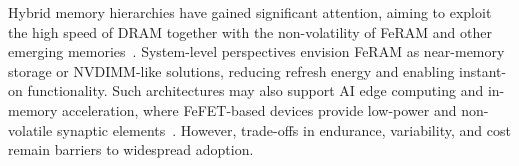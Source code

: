 Hybrid memory hierarchies have gained significant attention, aiming to exploit the high speed of DRAM together with the non-volatility of FeRAM and other emerging memories~\cite{itrs2022, samsung2021}. 
System-level perspectives envision FeRAM as near-memory storage or NVDIMM-like solutions, reducing refresh energy and enabling instant-on functionality. 
Such architectures may also support AI edge computing and in-memory acceleration, where FeFET-based devices provide low-power and non-volatile synaptic elements~\cite{schaller2021_ai}. 
However, trade-offs in endurance, variability, and cost remain barriers to widespread adoption.
